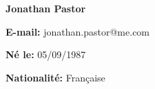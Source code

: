 \documentclass[french,11pt,a4paper]{moderncv}
\begin{document}
\makecvtitle

\vspace{-1.3cm}

\textbf{Jonathan Pastor}

\vspace{5mm} %



\textbf{E-mail:} jonathan.pastor@me.com

\textbf{Né le:} 05/09/1987

\textbf{Nationalité:} Française





\end{document}
